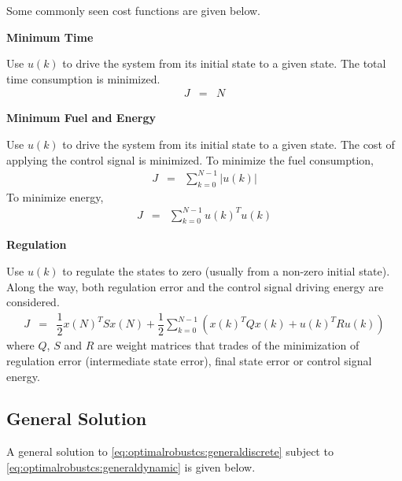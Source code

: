 Some commonly seen cost functions are given below.

\vspace{0.1in}
\noindent \textbf{Minimum Time}
\vspace{0.1in}

Use $u(k)$ to drive the system from its initial state to a given state. The total time consumption is minimized.
\begin{eqnarray}
  J &=& N \nonumber
\end{eqnarray}

\vspace{0.1in}
\noindent \textbf{Minimum Fuel and Energy}
\vspace{0.1in}

Use $u(k)$ to drive the system from its initial state to a given state. The cost of applying the control signal is minimized. To minimize the fuel consumption,
\begin{eqnarray}
  J &=& \sum_{k=0}^{N-1} |u(k)| \nonumber
\end{eqnarray}
To minimize energy,
\begin{eqnarray}
  J &=& \sum_{k=0}^{N-1} u(k)^Tu(k) \nonumber
\end{eqnarray}

\vspace{0.1in}
\noindent \textbf{Regulation}
\vspace{0.1in}

Use $u(k)$ to regulate the states to zero (usually from a non-zero initial state). Along the way, both regulation error and the control signal driving energy are considered.
\begin{eqnarray}
  J &=& \dfrac{1}{2}x(N)^TSx(N) + \dfrac{1}{2}\sum_{k=0}^{N-1}\left(x(k)^TQx(k) + u(k)^TRu(k)\right) \nonumber
\end{eqnarray}
where $Q$, $S$ and $R$ are weight matrices that trades of the minimization of regulation error (intermediate state error), final state error or control signal energy. 

\subsection{General Solution} \label{subsec:optimalrobustcs:optimalgeneralsolution}

A general solution to \eqref{eq:optimalrobustcs:generaldiscrete} subject to \eqref{eq:optimalrobustcs:generaldynamic} is given below.

